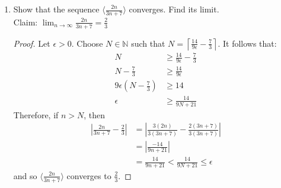 \documentclass{article}
\theoremstyle{problem}
\theoremstyle{plain}
\theoremstyle{remark}
\newcommand{\ceil}[1] {
  \left\lceil #1 \right\rceil
}
\newcommand{\abs}[1] {
  \left| #1 \right|
}
\begin{document}
\begin{enumerate}
\item Show that the sequence $\langle \frac{2n}{3n+7} \rangle$ converges. Find its limit.\\
  Claim: $\displaystyle \lim_{n \to \infty} \frac{2n}{3n+7} = \frac{2}{3}$\\[.5cm]
  \begin{proof}
  Let $\epsilon > 0$. Choose $N \in \mathbb N$ such that $N = \displaystyle \ceil{\frac{14}{9\epsilon} - \frac{7}{3}}$. It follows that:
  \begin{align*}
    N &\geq \frac{14}{9\epsilon} - \frac{7}{3}\\
    N - \frac{7}{3} &\geq \frac{14}{9\epsilon}\\
    9\epsilon(N - \frac{7}{3}) &\geq 14\\
    \epsilon &\geq \frac{14}{9N + 21}
  \end{align*}
  Therefore, if $n > N$, then
  \begin{align*}
    \abs{\frac{2n}{3n+7} - \frac{2}{3}} &= \abs{\frac{3(2n)}{3(3n+7)} - \frac{2(3n+7)}{3(3n+7)}}\\
    &= \abs{\frac{-14}{9n+21}}\\
    &= \frac{14}{9n+21} < \frac{14}{9N + 21} \leq \epsilon
  \end{align*}
  and so $\langle \frac{2n}{3n+7} \rangle$ converges to $\frac{2}{3}$.
\end{proof}


\end{enumerate}
\end{document}
